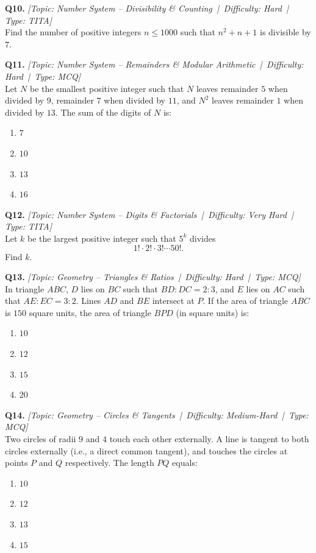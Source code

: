 \documentclass[11pt,a4paper]{article}
\newcommand{\qhead}[4]{\vspace{0.4em}\noindent\textbf{Q#1.} \textit{[Topic: #2 \,|\, Difficulty: #3 \,|\, Type: #4]}\\[0.15em]}
\begin{document}
\qhead{10}{Number System -- Divisibility \& Counting}{Hard}{TITA}
Find the number of positive integers $n \le 1000$ such that $n^{2} + n + 1$ is divisible by $7$.

\qhead{11}{Number System -- Remainders \& Modular Arithmetic}{Hard}{MCQ}
Let $N$ be the smallest positive integer such that $N$ leaves remainder $5$ when divided by $9$, remainder $7$ when divided by $11$, and $N^{2}$ leaves remainder $1$ when divided by $13$. The sum of the digits of $N$ is:
\begin{enumerate}[label=(\Alph*),leftmargin=2em]
    \item $7$
    \item $10$
    \item $13$
    \item $16$
\end{enumerate}

\qhead{12}{Number System -- Digits \& Factorials}{Very Hard}{TITA}
Let $k$ be the largest positive integer such that $5^{k}$ divides
\[ 1! \cdot 2! \cdot 3! \cdots 50!. \]
Find $k$.

\qhead{13}{Geometry -- Triangles \& Ratios}{Hard}{MCQ}
In triangle $ABC$, $D$ lies on $BC$ such that $BD:DC = 2:3$, and $E$ lies on $AC$ such that $AE:EC = 3:2$. Lines $AD$ and $BE$ intersect at $P$. If the area of triangle $ABC$ is $150$ square units, the area of triangle $BPD$ (in square units) is:
\begin{enumerate}[label=(\Alph*),leftmargin=2em]
    \item $10$
    \item $12$
    \item $15$
    \item $20$
\end{enumerate}

\qhead{14}{Geometry -- Circles \& Tangents}{Medium-Hard}{MCQ}
Two circles of radii $9$ and $4$ touch each other externally. A line is tangent to both circles externally (i.e., a direct common tangent), and touches the circles at points $P$ and $Q$ respectively. The length $PQ$ equals:
\begin{enumerate}[label=(\Alph*),leftmargin=2em]
    \item $10$
    \item $12$
    \item $13$
    \item $15$
\end{enumerate}
\end{document}
